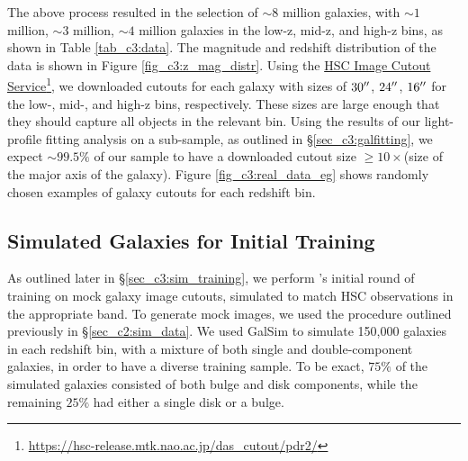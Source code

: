 The above process resulted in the selection of $\sim 8$ million galaxies, with $\sim1$ million, $\sim3$ million, $\sim4$ million galaxies in the low-z, mid-z, and high-z bins, as shown in Table \ref{tab_c3:data}. The magnitude and redshift distribution of the data is shown in Figure \ref{fig_c3:z_mag_distr}. Using the \href{https://hsc-release.mtk.nao.ac.jp/das_cutout/pdr2/}{HSC Image Cutout Service}\footnote{\href{https://hsc-release.mtk.nao.ac.jp/das_cutout/pdr2/}{https://hsc-release.mtk.nao.ac.jp/das\_cutout/pdr2/}}, we downloaded cutouts for each galaxy with sizes of $30\mbox{$^{\prime\prime}$}$, $24\mbox{$^{\prime\prime}$}$, $16\mbox{$^{\prime\prime}$}$ for the low-, mid-, and high-z bins, respectively. These sizes are large enough that they should capture all objects in the relevant bin. Using the results of our light-profile fitting analysis on a sub-sample, as outlined in \S \ref{sec_c3:galfitting}, we expect $\sim99.5\%$ of our sample to have a downloaded cutout size $\geq10\times$(size of the major axis of the galaxy). Figure \ref{fig_c3:real_data_eg} shows randomly chosen examples of galaxy cutouts for each redshift bin. 



\subsection{Simulated Galaxies for Initial Training} \label{sec_c3:sim_data}

As outlined later in \S \ref{sec_c3:sim_training}, we perform \gampen{}'s initial round of training on mock galaxy image cutouts, simulated to match HSC observations in the appropriate band. To generate mock images, we used the procedure outlined previously in \S \ref{sec_c2:sim_data}. We used GalSim to simulate 150,000 galaxies in each redshift bin, with a mixture of both single and double-component galaxies, in order to have a diverse training sample. To be exact, $75\%$ of the simulated galaxies consisted of both bulge and disk components, while the remaining $25\%$ had either a single disk or a bulge.

